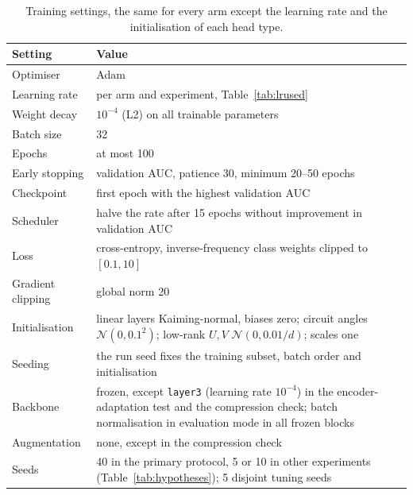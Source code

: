 \documentclass{ieeeaccess}
\begin{document}
\begin{table}[t]
\caption{Training settings, the same for every arm except the learning rate and the initialisation of each head type.}
\label{tab:training}
\centering
\setlength{\tabcolsep}{4pt}
\footnotesize
\begin{tabular}{@{}L{2.5cm}L{5.4cm}@{}}
\toprule
Setting & Value\\
\midrule
Optimiser & Adam~\cite{kingma2015}\\
Learning rate & per arm and experiment, Table~\ref{tab:lrused}\\
Weight decay & $10^{-4}$ (L2) on all trainable parameters\\
Batch size & 32\\
Epochs & at most 100\\
Early stopping & validation AUC, patience 30, minimum 20--50 epochs\\
Checkpoint & first epoch with the highest validation AUC\\
Scheduler & halve the rate after 15 epochs without improvement in validation AUC\\
Loss & cross-entropy, inverse-frequency class weights clipped to $[0.1,10]$\\
Gradient clipping & global norm 20\\
Initialisation & linear layers Kaiming-normal, biases zero; circuit angles $\mathcal{N}(0,0.1^2)$; low-rank $U,V$ $\mathcal{N}(0,0.01/d)$; scales one\\
Seeding & the run seed fixes the training subset, batch order and initialisation\\
Backbone & frozen, except \texttt{layer3} (learning rate $10^{-4}$) in the encoder-adaptation test and the compression check; batch normalisation in evaluation mode in all frozen blocks\\
Augmentation & none, except in the compression check\\
Seeds & 40 in the primary protocol, 5 or 10 in other experiments (Table~\ref{tab:hypotheses}); 5 disjoint tuning seeds\\
\bottomrule
\end{tabular}
\end{table}
\end{document}
